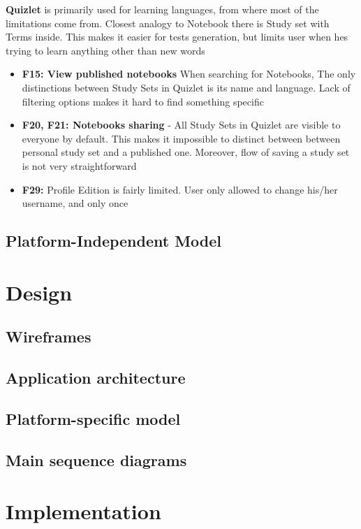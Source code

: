 \documentclass[thesis=B,english]{FITthesis}[2012/10/20]
\begin{document}
\bigskip
\textbf{Quizlet} is primarily used for learning languages, from where most of the limitations come from. Closest analogy to Notebook there is Study set with Terms inside. This makes it easier for tests generation, but limits user when hes trying to learn anything other than new words

\begin{itemize}
	\item \textbf{F15: View published notebooks} When searching for Notebooks, The only distinctions between Study Sets in Quizlet is its name and language. Lack of filtering options makes it hard to find something specific
	\item \textbf{F20, F21: Notebooks sharing} - All Study Sets in Quizlet are visible to everyone by default. This makes it impossible to distinct between between personal study set and a published one. Moreover, flow of saving a study set is not very straightforward
	\item \textbf{F29: } Profile Edition is fairly limited. User only allowed to change his/her username, and only once





\end{itemize}




\section{Platform-Independent Model}


\chapter{Design}
\section{Wireframes}
\section{Application architecture}
\section{Platform-specific model}
\section{Main sequence diagrams}

\chapter{Implementation}
\end{document}
